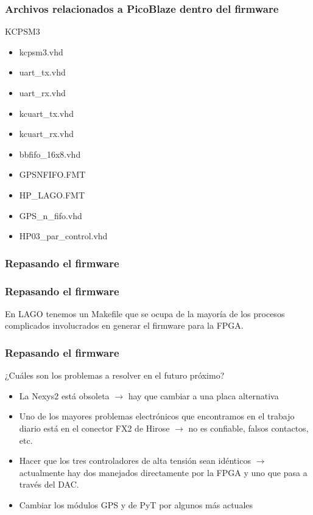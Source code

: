 \documentclass{beamer}
\begin{document}
\begin{frame}
  \frametitle{Archivos relacionados a PicoBlaze dentro del firmware}
  \begin{block}{KCPSM3}
    \begin{itemize}
      \item kcpsm3.vhd
      \item uart\_tx.vhd
      \item uart\_rx.vhd
      \item kcuart\_tx.vhd
      \item kcuart\_rx.vhd
      \item bbfifo\_16x8.vhd
      \item GPSNFIFO.FMT
      \item HP\_LAGO.FMT
      \item GPS\_n\_fifo.vhd
      \item HP03\_par\_control.vhd
    \end{itemize}
\end{block}
\end{frame}

\begin{frame}
  \frametitle{Repasando el firmware}
  \begin{block}{}
    \centering
  \end{block}
\end{frame}

\begin{frame}
  \frametitle{Repasando el firmware}
  \begin{block}{En LAGO tenemos un Makefile que se ocupa de la mayoría de los
                procesos complicados involucrados en generar el firmware para la
                FPGA.}
    \centering
  \end{block}
\end{frame}

\begin{frame}
  \frametitle{Repasando el firmware}
    \begin{block}{¿Cuáles son los problemas a resolver en el futuro próximo?}
      \begin{itemize}
        \pause
        \item La Nexys2 está obsoleta $\rightarrow$ hay que cambiar a una placa
							alternativa 
        \pause
        \item Uno de los mayores problemas electrónicos que encontramos en el
              trabajo diario está en el conector FX2 de Hirose $\rightarrow$ no
							es confiable, falsos contactos, etc.
        \pause
        \item Hacer que los tres controladores de alta tensión sean idénticos
							$\rightarrow$ actualmente hay dos manejados directamente por la
							FPGA y uno que pasa a través del DAC.
        \pause
        \item Cambiar los módulos GPS y de PyT por algunos más actuales
      \end{itemize}
    \end{block}
\end{frame}
\end{document}
